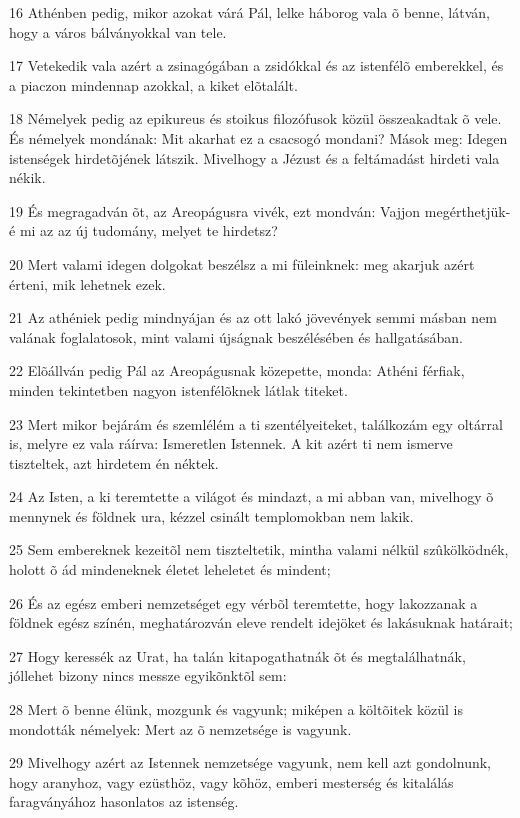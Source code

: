 \par 16 Athénben pedig, mikor azokat várá Pál, lelke háborog vala õ benne, látván, hogy a város bálványokkal van tele.
\par 17 Vetekedik vala azért a zsinagógában a zsidókkal és az istenfélõ emberekkel, és a piaczon mindennap azokkal, a kiket elõtalált.
\par 18 Némelyek pedig az epikureus és stoikus filozófusok közül összeakadtak õ vele. És némelyek mondának: Mit akarhat ez a csacsogó mondani? Mások meg: Idegen istenségek hirdetõjének látszik. Mivelhogy a Jézust és a feltámadást hirdeti vala nékik.
\par 19 És megragadván õt, az Areopágusra vivék, ezt mondván: Vajjon megérthetjük-é mi az az új tudomány, melyet te hirdetsz?
\par 20 Mert valami idegen dolgokat beszélsz a mi füleinknek: meg akarjuk azért érteni, mik lehetnek ezek.
\par 21 Az athéniek pedig mindnyájan és az ott lakó jövevények semmi másban nem valának foglalatosok, mint valami újságnak beszélésében és hallgatásában.
\par 22 Elõállván pedig Pál az Areopágusnak közepette, monda: Athéni férfiak, minden tekintetben nagyon istenfélõknek látlak titeket.
\par 23 Mert mikor bejárám és szemlélém a ti szentélyeiteket, találkozám egy oltárral is, melyre ez vala ráírva: Ismeretlen Istennek. A kit azért ti nem ismerve tiszteltek, azt hirdetem én néktek.
\par 24 Az Isten, a ki teremtette a világot és mindazt, a mi abban van, mivelhogy õ mennynek és földnek ura, kézzel csinált templomokban  nem lakik.
\par 25 Sem embereknek kezeitõl nem tiszteltetik, mintha valami nélkül szûkölködnék, holott õ ád mindeneknek életet leheletet és  mindent;
\par 26 És az egész emberi nemzetséget egy vérbõl teremtette, hogy lakozzanak a földnek egész színén, meghatározván eleve rendelt idejöket és  lakásuknak határait;
\par 27 Hogy keressék az Urat, ha talán kitapogathatnák õt és megtalálhatnák, jóllehet bizony nincs messze egyikõnktõl sem:
\par 28 Mert õ benne élünk, mozgunk és vagyunk; miképen a költõitek közül is mondották némelyek: Mert az õ nemzetsége is vagyunk.
\par 29 Mivelhogy azért az Istennek nemzetsége vagyunk, nem kell azt gondolnunk, hogy aranyhoz, vagy ezüsthöz, vagy kõhöz, emberi mesterség és kitalálás faragványához hasonlatos az istenség.
